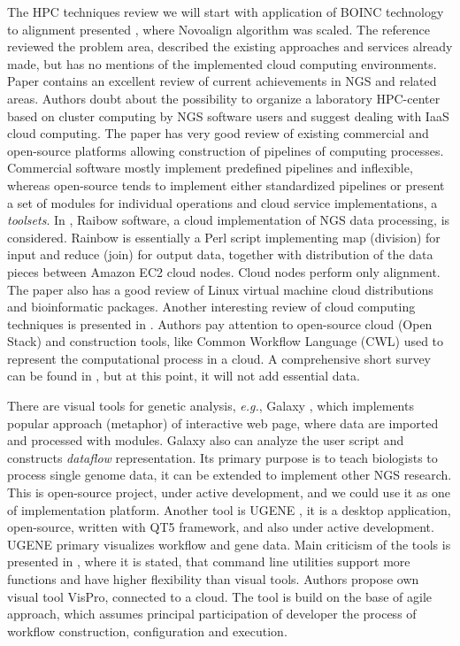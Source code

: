 \documentclass[a4paper]{jpconf}
\begin{document}
The HPC techniques review we will start with application of BOINC technology to alignment presented \cite{boinc10}, where Novoalign algorithm was scaled.
The reference \cite{guo16} reviewed the problem area, described the existing approaches and services already made, but has no mentions of the implemented cloud computing environments.
%
Paper \cite{kwon15} contains an excellent review of current achievements in NGS and related areas. Authors doubt about the possibility to organize a laboratory HPC-center based on cluster computing by NGS software users and suggest dealing with IaaS cloud computing. The paper has very good review of existing commercial and open-source platforms allowing construction of pipelines of computing processes. Commercial software mostly implement predefined pipelines and inflexible, whereas open-source tends to implement either standardized pipelines or present a set of modules for individual operations and cloud service implementations, a \emph{toolsets}.
%
In \cite{zhao17}, Raibow software, a cloud implementation of NGS data processing, is considered. Rainbow is essentially a Perl script implementing map (division) for input and reduce (join) for output data, together with distribution of the data pieces between Amazon EC2 cloud nodes. Cloud nodes perform only alignment. The paper also has a good review of Linux virtual machine cloud distributions and bioinformatic packages.
Another interesting review of cloud computing techniques is presented in \cite{lang18}. Authors pay attention to open-source cloud (Open Stack) and construction tools, like Common Workflow Language (CWL) \cite{cwl} used to represent the computational process in a cloud.
A comprehensive short survey can be found in \cite{baker18}, but at this point, it will not add essential data.

There are visual tools for genetic analysis, \emph{e.g.}, Galaxy \cite{galaxy18}, which implements popular approach (metaphor) of interactive web page, where data are imported and processed with modules. Galaxy also can analyze the user script and constructs \emph{dataflow} representation. Its primary purpose is to teach biologists to process single genome data, it can be extended to implement other NGS research. This is open-source project, under active development, and we could use it as one of implementation platform. Another tool is UGENE \cite{ugene18}, it is a desktop application, open-source, written with QT5 framework, and also under active development. UGENE primary visualizes workflow and gene data. Main criticism of the tools is presented in \cite{mill16}, where it is stated, that command line utilities support more functions and have higher flexibility than visual tools. Authors propose own visual tool VisPro, connected to a cloud. The tool is build on the base of agile approach, which assumes principal participation of developer the process of workflow construction, configuration and execution.
\end{document}
